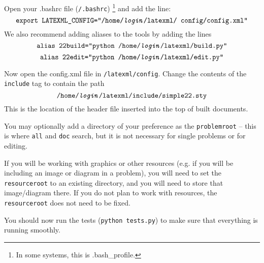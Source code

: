     Open your .bashrc file (\texttt{\mytilde/.bashrc})
    \footnote{In some systems, this is .bash\_profile.} 
    and add the line: 
    \[\texttt{export LATEXML\_CONFIG=\ttquote /home/\textit{login}/latexml/
    config/config.xml\ttquote}\] We also recommend adding aliases to the 
    tools by adding the lines 
    \[\texttt{alias 22build=\ttquote python /home/\textit{login}/latexml/build.py\ttquote}\]
    \[\texttt{alias 22edit=\ttquote python /home/\textit{login}/latexml/edit.py\ttquote}\]
    
    Now open the config.xml file in \texttt{\mytilde/latexml/config}. 
    Change the contents of the \texttt{include} tag to contain the path 
    \[\texttt{/home/\textit{login}/latexml/include/simple22.sty}\] 
    This is the location of 
    the header file inserted into the top of built documents. 
    
    You may optionally
    add a directory of your preference as the \texttt{problemroot} -- this
    is where \texttt{\pybuild all} and \texttt{\pybuild doc} search, but
    it is not necessary for single problems or for editing.
    
    If you will be working with graphics or other resources (e.g. if you
    will be including an image or diagram in a problem), you will need to
    set the \texttt{resourceroot} to an existing directory, and you will
    need to store that image/diagram there. If you do not plan to work
    with resources, the \texttt{resourceroot} does not need to be fixed.
    
    You should now run the tests (\texttt{python tests.py}) to make sure that 
    everything is running smoothly.
    